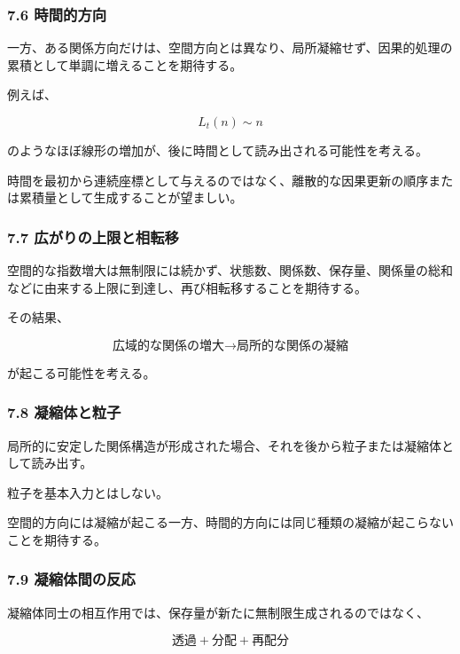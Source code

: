 \documentclass[
  a4paper,
]{ltjsarticle}
\begin{document}
\subsubsection{7.6 時間的方向}\label{ux6642ux9593ux7684ux65b9ux5411}

一方、ある関係方向だけは、空間方向とは異なり、局所凝縮せず、因果的処理の累積として単調に増えることを期待する。

例えば、

\[
\boxed{
L_t(n)\sim n
}
\]

のようなほぼ線形の増加が、後に時間として読み出される可能性を考える。

時間を最初から連続座標として与えるのではなく、離散的な因果更新の順序または累積量として生成することが望ましい。

\subsubsection{7.7
広がりの上限と相転移}\label{ux5e83ux304cux308aux306eux4e0aux9650ux3068ux76f8ux8ee2ux79fb}

空間的な指数増大は無制限には続かず、状態数、関係数、保存量、関係量の総和などに由来する上限に到達し、再び相転移することを期待する。

その結果、

\[
\boxed{
\text{広域的な関係の増大}
\rightarrow
\text{局所的な関係の凝縮}
}
\]

が起こる可能性を考える。

\subsubsection{7.8
凝縮体と粒子}\label{ux51ddux7e2eux4f53ux3068ux7c92ux5b50}

局所的に安定した関係構造が形成された場合、それを後から粒子または凝縮体として読み出す。

粒子を基本入力とはしない。

空間的方向には凝縮が起こる一方、時間的方向には同じ種類の凝縮が起こらないことを期待する。

\subsubsection{7.9
凝縮体間の反応}\label{ux51ddux7e2eux4f53ux9593ux306eux53cdux5fdc}

凝縮体同士の相互作用では、保存量が新たに無制限生成されるのではなく、

\[
\boxed{
\text{透過}+\text{分配}+\text{再配分}
}
\]
\end{document}

